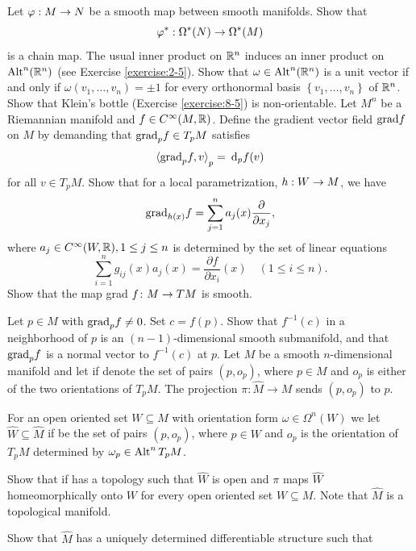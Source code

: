 \begin{enumerate}[\theexercise.1]
  \NewItem Let $\varphi  : M \rightarrow  N$ be a smooth map between smooth manifolds. Show that
    \[
      {\varphi }^* : {\Omega }^*( N)  \rightarrow  {\Omega }^*( M)
    \]
    is a chain map.
  \NewItem The usual inner product on ${\mathbb{R}}^{n}$ induces an inner product on ${\operatorname{Alt}}^{n}( {\mathbb{R}}^{n})$ (see Exercise \ref{exercise:2-5}). Show that $\omega  \in  {\operatorname{Alt}}^{n}( {\mathbb{R}}^{n})$ is a unit vector if and only if $\omega ( {{v}_{1},\ldots,{v}_{n}})  =  \pm  1$ for every orthonormal basis $\left\{  {{v}_{1},\ldots,{v}_{n}}\right\}$ of ${{\mathbb{R}}}^{n}$.
  \NewItem Show that Klein's bottle (Exercise \ref{exercise:8-5}) is non-orientable.
  \NewItem Let ${M}^{n}$ be a Riemannian manifold and $f \in  {C}^{\infty }( {M,{\mathbb{R}}})$. Define the gradient vector field $\mathrm{grad}f$ on $M$ by demanding that ${\mathrm{grad}}_{p}f \in  {T}_{p}M$ satisfies
    \[
      {\langle  {\R{grad}}_{p}f,v\rangle  }_{p} = {\dd}_{p}f( v)
    \]
    for all $v \in  {T}_{p}M$. Show that for a local parametrization, $h : W \rightarrow  M$, we
    have
    \[
      {\mathrm{grad}}_{h( x) }f = \sum_{{j = 1}}^{n}{a}_{j}( x) \frac{\partial }{\partial {x}_{j}},
    \]
    where ${a}_{j} \in  {C}^{\infty }( {W,\mathbb{R}}),1 \leq  j \leq  n$ is determined by the set of linear equations
    \[
      \sum_{i=1}^{n}{g}_{ij}( x) {a}_{j}( x)  = \frac{\partial f}{\partial {x}_{i}}( x) \quad( {1 \leq  i \leq  n}).
    \]
    Show that the map grad $f\colon M \rightarrow  {TM}$ is smooth.\par
    Let $p \in  M$ with ${\mathrm{grad}}_{p}f \neq  0$. Set $c = f( p)$. Show that ${f}^{-1}( c)$ in a neighborhood of $p$ is an $(n- 1)$-dimensional smooth submanifold, and that ${\mathrm{grad}}_{p}f$ is a normal vector to ${f}^{-1}( c)$ at $p$.
  \NewItem Let $M$ be a smooth $n$-dimensional manifold and let if denote the set of
    pairs $(p, o_p)$, where $p\in M$ and $o_p$ is either of the two orientations of $T_pM$. The projection
    $\pi:\hat M\to M$ sends $(p, o_p)$ to $p$.\par
    For an open oriented set $W\subseteq M$ with orientation form $\omega\in\Omega^n(W)$ we let
    $\hat W\subseteq\hat M$ if be the set of pairs $(p, o_p)$, where $p\in W$ and $o_p$ is the orientation
    of $T_pM$ determined by $\omega_p\in\operatorname{Alt}^nT_pM$.\par
    Show that if has a topology such that $\hat W$ is open and $\pi$ maps $\hat W$
    homeomorphically onto $W$ for every open oriented set $W\subseteq M$. Note
    that $\hat M$ is a topological manifold.\par
    Show that $\hat M$ has a uniquely determined differentiable structure such that

\end{enumerate}
